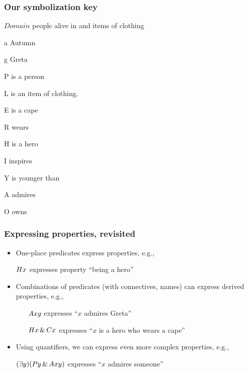 \begin{frame}
\frametitle{Our symbolization key}

    \begin{ekey}
    \item[$Domain$] people alive in \year{} and items of clothing
    \item[a] Autumn
    \item[g] Greta
    \item[P\qv{x}]  is a person
    \item[L\qv{x}]  is an item of clothing.
    \item[E\qv{x}]  is a cape
    \item[R\qr{x}{y}]  wears 
    \item[H\qv{x}]  is a hero
    \item[I\qv{x}]  inspires
    \item[Y\qr{x}{y}]  is younger than 
    \item[A\qr{x}{y}]  admires 
    \item[O\qr{x}{y}]  owns 
    \end{ekey}
\end{frame}


\begin{frame}
  \frametitle{Expressing properties, revisited}
    \begin{itemize}[<+->]
      \item One-place predicates express properties, e.g.,
      \item[] $Hx$ expresses property ``being a hero''
      \item Combinations of predicates (with connectives, names) can
      express derived properties, e.g.,
      \begin{itemize}[<+->]
        \item[] $Axg$ expresses ``$x$ admires Greta''
        \item[] $Hx \,\&\, Cx$ expresses ``$x$ is a hero who wears a cape''
      \end{itemize}
    \item Using quantifiers, we can express even more complex
    properties, e.g.,
    \item[] $(\exists y)(Py \,\&\, Axy)$ expresses ``$x$ admires someone''
    \end{itemize}
  \end{frame}
  
